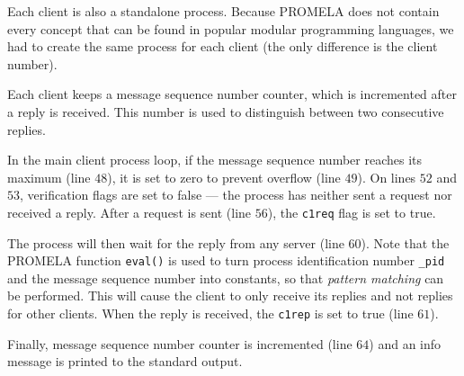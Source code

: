 Each client is also a standalone process. Because PROMELA does not contain every concept that can be found in popular modular programming languages, we had to create the same process for each client (the only difference is the client number).

Each client keeps a message sequence number counter, which is incremented after a reply is received. This number is used to distinguish between two consecutive replies.

In the main client process loop, if the message sequence number reaches its maximum (line $48$), it is set to zero to prevent overflow (line $49$). On lines $52$ and $53$, verification flags are set to false --- the process has neither sent a request nor received a reply. After a request is sent (line $56$), the \texttt{c1req} flag is set to true.

The process will then wait for the reply from any server (line $60$). Note that the PROMELA function \texttt{eval()} is used to turn process identification number \texttt{\_pid} and the message sequence number into constants, so that \emph{pattern matching} can be performed. This will cause the client to only receive its replies and not replies for other clients. When the reply is received, the \texttt{c1rep} is set to true (line $61$).

Finally, message sequence number counter is incremented (line $64$) and an info message is printed to the standard output.

